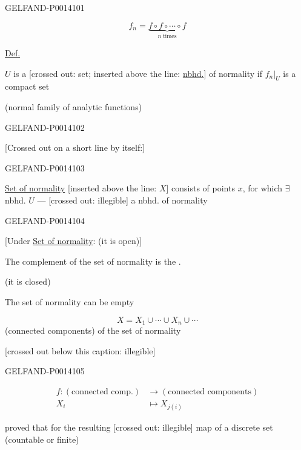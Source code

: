 \begin{GelfandAdjacentEvidence}{GELFAND-P001410}{1}

\[
f_n=\underbrace{f\circ f\circ\cdots\circ f}_{n\ \text{times}}
\]

\uline{Def.}

\(U\) is a
[crossed out: set; inserted above the line: \uline{nbhd.}]
of normality if \(\left.f_n\right|_U\) is a compact set

(normal family of analytic functions)
\end{GelfandAdjacentEvidence}
\begin{GelfandAdjacentEvidence}{GELFAND-P001410}{2}


[Crossed out on a short line by itself:]
\end{GelfandAdjacentEvidence}
\begin{GelfandAdjacentEvidence}{GELFAND-P001410}{3}


\uline{Set of normality} [inserted above the line: \(X\)] consists of points \(x\),
for which \(\exists\) nbhd. \(U\) ---
[crossed out: illegible] a nbhd. of normality
\end{GelfandAdjacentEvidence}
\begin{GelfandAdjacentEvidence}{GELFAND-P001410}{4}


[Under \uline{Set of normality}: (it is open)]

The complement of the set of normality is the .

(it is closed)

The set of normality can be empty

\[
X=X_1\cup\cdots\cup X_n\cup\cdots
\]
(connected components) of the set of normality

[crossed out below this caption: illegible]
\end{GelfandAdjacentEvidence}
\begin{GelfandAdjacentEvidence}{GELFAND-P001410}{5}


\[
\begin{aligned}
f:(\text{connected comp.})&\to(\text{connected components})\\
X_i&\mapsto X_{j(i)}
\end{aligned}
\]

 proved that for the resulting [crossed out: illegible]
map of a discrete set (countable or finite)
\end{GelfandAdjacentEvidence}
